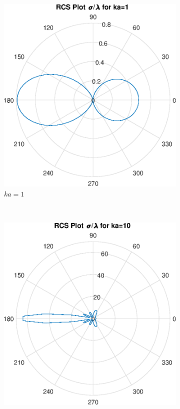 \documentclass[11pt]{amsart}
\begin{document}
\begin{figure}[!h]
\begin{subfigure}[b]{0.45\textwidth}
        \includegraphics[width=\textwidth]{RCSka1}
        \caption{$ka=1$}
        \label{fig:tiger}
    \end{subfigure}
  \\
  \begin{subfigure}[b]{0.45\textwidth}
        \includegraphics[width=\textwidth]{RCSka10}

\end{subfigure}
\end{figure}
\end{document}
